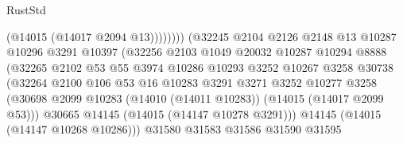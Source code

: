 \begin{lexlean}{RustStd}
\begin{coremodule}
                                              (@14015 (@14017 @2094 @13))))))))
                                  (@32245
                                    @2104
                                    @2126
                                    @2148
                                    @13
                                    @10287
                                    @10296
                                    @3291
                                    @10397
                                    (@32256
                                      @2103
                                      @1049
                                      @20032
                                      @10287
                                      @10294
                                      @8888
                                      (@32265
                                        @2102
                                        @53
                                        @55
                                        @3974
                                        @10286
                                        @10293
                                        @3252
                                        @10267
                                        @3258
                                        @30738
                                        (@32264
                                          @2100
                                          @106
                                          @53
                                          @16
                                          @10283
                                          @3291
                                          @3271
                                          @3252
                                          @10277
                                          @3258
                                          (@30698
                                            @2099
                                            @10283
                                            (@14010 (@14011 @10283))
                                            (@14015 (@14017 @2099 @53)))
                                          @30665
                                          @14145
                                          (@14015 (@14147 @10278 @3291)))
                                        @14145
                                        (@14015 (@14147 @10268 @10286)))
                                      @31580
                                      @31583
                                      @31586
                                      @31590
                                      @31595

\end{coremodule}
\end{lexlean}
